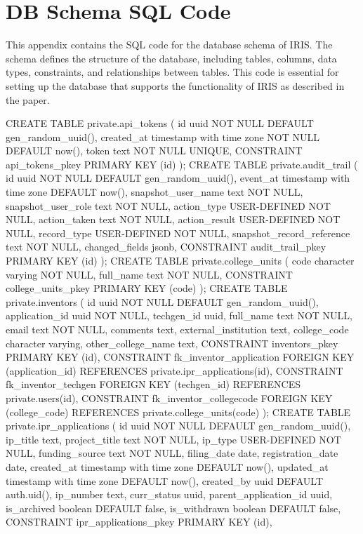 \chapter{DB Schema SQL Code}
\label{sec:appendixc}
This appendix contains the SQL code for the database schema of IRIS. The schema defines the structure of the database, including tables, columns, data types, constraints, and relationships between tables. This code is essential for setting up the database that supports the functionality of IRIS as described in the paper.

CREATE TABLE private.api_tokens (
  id uuid NOT NULL DEFAULT gen_random_uuid(),
  created_at timestamp with time zone NOT NULL DEFAULT now(),
  token text NOT NULL UNIQUE,
  CONSTRAINT api_tokens_pkey PRIMARY KEY (id)
);
CREATE TABLE private.audit_trail (
  id uuid NOT NULL DEFAULT gen_random_uuid(),
  event_at timestamp with time zone DEFAULT now(),
  snapshot_user_name text NOT NULL,
  snapshot_user_role text NOT NULL,
  action_type USER-DEFINED NOT NULL,
  action_taken text NOT NULL,
  action_result USER-DEFINED NOT NULL,
  record_type USER-DEFINED NOT NULL,
  snapshot_record_reference text NOT NULL,
  changed_fields jsonb,
  CONSTRAINT audit_trail_pkey PRIMARY KEY (id)
);
CREATE TABLE private.college_units (
  code character varying NOT NULL,
  full_name text NOT NULL,
  CONSTRAINT college_units_pkey PRIMARY KEY (code)
);
CREATE TABLE private.inventors (
  id uuid NOT NULL DEFAULT gen_random_uuid(),
  application_id uuid NOT NULL,
  techgen_id uuid,
  full_name text NOT NULL,
  email text NOT NULL,
  comments text,
  external_institution text,
  college_code character varying,
  other_college_name text,
  CONSTRAINT inventors_pkey PRIMARY KEY (id),
  CONSTRAINT fk_inventor_application FOREIGN KEY (application_id) REFERENCES private.ipr_applications(id),
  CONSTRAINT fk_inventor_techgen FOREIGN KEY (techgen_id) REFERENCES private.users(id),
  CONSTRAINT fk_inventor_collegecode FOREIGN KEY (college_code) REFERENCES private.college_units(code)
);
CREATE TABLE private.ipr_applications (
  id uuid NOT NULL DEFAULT gen_random_uuid(),
  ip_title text,
  project_title text NOT NULL,
  ip_type USER-DEFINED NOT NULL,
  funding_source text NOT NULL,
  filing_date date,
  registration_date date,
  created_at timestamp with time zone DEFAULT now(),
  updated_at timestamp with time zone DEFAULT now(),
  created_by uuid DEFAULT auth.uid(),
  ip_number text,
  curr_status uuid,
  parent_application_id uuid,
  is_archived boolean DEFAULT false,
  is_withdrawn boolean DEFAULT false,
  CONSTRAINT ipr_applications_pkey PRIMARY KEY (id),
